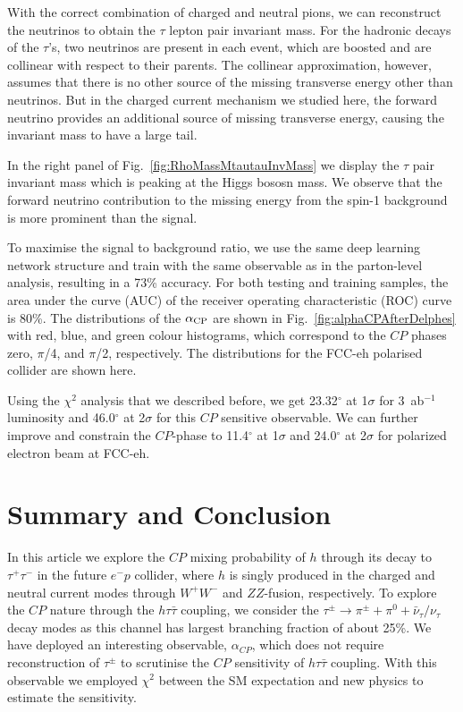 \documentclass[pdftex,twocolumn,epjc3]{svjour3}          %
\begin{document}
With the correct combination of charged and neutral pions, we can reconstruct the neutrinos to obtain the $\tau$ lepton pair invariant mass. For the hadronic decays of the $\tau$'s, two neutrinos are present in each event, which are boosted and are collinear with respect to their parents. The collinear approximation, however, assumes that there is no other source of the missing transverse energy other than neutrinos. But in the charged current mechanism we studied here, the forward neutrino provides an additional source of missing transverse energy, causing the invariant mass to have a large tail.

\par In the right panel of Fig.~\ref{fig:RhoMassMtautauInvMass}  we display the $\tau$ pair invariant mass which is peaking at the Higgs bososn mass. We observe that the forward neutrino contribution to the missing energy from the spin-1 background is more prominent than the signal.


\par To maximise the signal to background ratio, we use the same deep learning network structure and train with the same observable as in the parton-level analysis, resulting in a 73\% accuracy. For both testing and training samples, the area under the curve (AUC) of the receiver operating characteristic (ROC) curve is 80\%. The distributions of the $\alpha_{\rm CP}$ are shown in Fig.~\ref{fig:alphaCPAfterDelphes} with red, blue, and green colour histograms, which correspond to the $CP$ phases zero, $\pi$/4, and $\pi$/2, respectively. The distributions for the FCC-eh polarised collider are shown here.

Using the $\chi^2$ analysis that we described before, we get 23.32$^\circ$ at 1$\sigma$ for 3~ab$^{-1}$ luminosity and  46.0$^\circ$ at 2$\sigma$ for this $CP$ sensitive observable. We can further improve and constrain the $CP$-phase to  11.4$^\circ$ at 1$\sigma$ and 24.0$^\circ$ at 2$\sigma$ for polarized electron beam at FCC-eh. 


\section{Summary and Conclusion}
\label{summaryAndConclusion}

\par In this article we explore the $CP$ mixing probability of $h$ through its decay to $\tau^+\tau^-$ in the future $e^-p$ collider, where $h$ is singly produced in the charged and neutral current modes through $W^+W^-$ and $ZZ$-fusion, respectively. 
To explore the $CP$ nature through the $h\tau\bar\tau$ coupling, we consider the $\tau^{\pm} \to \pi^{\pm} + \pi^{0} + \bar\nu_\tau/\nu_\tau$ decay modes as this channel has largest branching fraction of about 25\%.   
We have deployed an interesting observable, $\alpha_{CP}$, which does not require reconstruction of $\tau^\pm$ to scrutinise the $CP$ sensitivity of $h\tau\bar\tau$ coupling. With this observable we employed $\chi^2$ between the SM expectation and new physics to estimate the sensitivity. 
\end{document}
